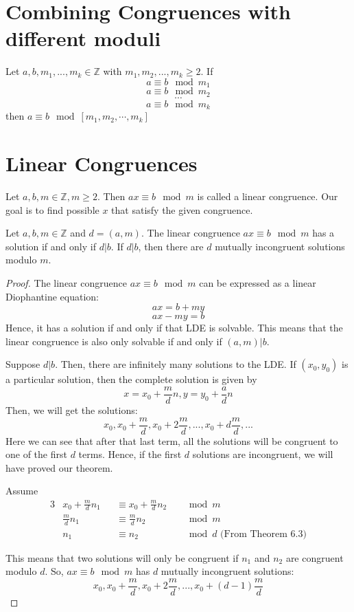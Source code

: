 \documentclass[12pt,letterpaper]{book}
\theoremstyle{definition}
\newcommand{\Z}{\mathbb{Z}}
\begin{document}
\section{Combining Congruences with different moduli}
\phantom{}
\begin{theorem}
  Let $a,b,m_1,...,m_k \in \Z$ with $m_1,m_2,...,m_k \geq 2$. If
  \[a \equiv b \mod m_1\]
  \[a \equiv b \mod m_2\]
  \[\cdots\]
  \[a \equiv b \mod m_k\]
  then $a \equiv b \mod [m_1,m_2,\cdots,m_k]$
\end{theorem}

\section{Linear Congruences}

Let $a,b,m \in \Z, m \geq 2$. Then $ax \equiv b \mod m$ is called a linear congruence. Our goal is to find possible $x$ that satisfy the given congruence.

\begin{theorem}
  Let $a,b,m \in \Z$ and $d = (a,m)$. The linear congruence $ax \equiv b \mod m$ has a solution if and only if $d | b$. If $d | b$, then there are $d$ mutually incongruent solutions modulo $m$.
\end{theorem}
\begin{proof}
  The linear congruence $ax \equiv b \mod m$ can be expressed as a linear Diophantine equation:
  \[ax = b + my\]
  \[ax - my = b\]
  Hence, it has a solution if and only if that LDE is solvable. This means that the linear congruence is also only solvable if and only if $(a,m) | b$.

  Suppose $d|b$. Then, there are infinitely many solutions to the LDE. If $(x_0,y_0)$ is a particular solution, then the complete solution is given by
  \[x = x_0 + \frac{m}{d}n, y = y_0 + \frac{a}{d}n\]
  Then, we will get the solutions:
\[x_0, x_0 + \frac{m}{d}, x_0 + 2\frac{m}{d},...,x_0 + d\frac{m}{d},...\]
Here we can see that after that last term, all the solutions will be congruent to one of the first $d$ terms. Hence, if the first $d$ solutions are incongruent, we will have proved our theorem.

Assume
\begin{alignat*}{3}
  &x_0 + \frac{m}{d}n_1 &&\equiv x_0 + \frac{m}{d} n_2 &&\mod m \\
  &\frac{m}{d}n_1 &&\equiv \frac{m}{d}n_2 &&\mod m \\
  &n_1 &&\equiv n_2 &&\mod d \text{ (From Theorem 6.3)}
\end{alignat*}

This means that two solutions will only be congruent if $n_1$ and $n_2$ are congruent modulo $d$. So, $ax \equiv b \mod m$ has $d$ mutually incongruent solutions:
\[x_0,x_0 + \frac{m}{d}, x_0 + 2\frac{m}{d},..., x_0 + (d-1)\frac{m}{d}\]
\end{proof}
\end{document}
